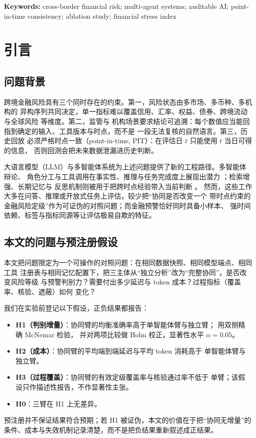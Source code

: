\documentclass[UTF8,fontset=fandol,11pt,a4paper]{ctexart}
\begin{document}
\vspace{0.6em}
\noindent\textbf{Keywords:} cross-border financial risk; multi-agent systems; auditable AI;
point-in-time consistency; ablation study; financial stress index

\section{引言}

\subsection{问题背景}

跨境金融风险具有三个同时存在的约束。第一，风险状态由多市场、多币种、多机构的
异构序列共同决定，单一指标难以覆盖信用、汇率、权益、债券、跨境流动与全球风险
等维度\citep{illing2006measuring,hollo2012ciss,cardarelli2011financial}。第二，监管与
机构场景要求结论可追溯：每个数值应当能回指到确定的输入、工具版本与时点，而不是
一段无法复核的自然语言\citep{schneier1999audit,parno2013pinocchio}。第三，历史回放
必须严格时点一致（point-in-time, PIT）：在评估日 $t$ 只能使用 $t$ 当日可得的信息，
否则回测会把未来数据泄漏进历史判断\citep{kaufman2012leakage,bailey2016overfitting}。

大语言模型（LLM）与多智能体系统为上述问题提供了新的工程路径。多智能体辩论、
角色分工与工具调用在事实性、推理与任务完成度上展现出潜力
\citep{du2023debate,liang2023mad,wu2023autogen,hong2023metagpt}；检索增强、长期记忆与
反思机制则被用于把跨时点经验带入当前判断
\citep{lewis2020rag,park2023generative,shinn2023reflexion,packer2023memgpt}。
然而，这些工作大多在问答、推理或开放式任务上评估，较少把“协同是否改变一个
带时点约束的金融风险定级”作为可证伪的对照问题；而金融预警恰好同时具备小样本、
强时间依赖、标签与指标同源等让评估极易自欺的特征。

\subsection{本文的问题与预注册假设}

本文把问题限定为一个可操作的对照问题：在相同数据快照、相同模型端点、相同工具
注册表与相同记忆配置下，把三主体从“独立分析”改为“完整协同”，是否改变风险等级
与预警判别力？需要付出多少延迟与 token 成本？过程指标（覆盖率、核验、遮蔽）如何
变化？

我们在实验前登记以下假设，正负结果都报告：
\begin{itemize}
  \item \textbf{H1（判别增量）}：协同臂的均衡准确率高于单智能体臂与独立臂；
        用双侧精确 McNemar 检验，
        并对两项比较做 Holm 校正，显著性水平 $\alpha=0.05$。
  \item \textbf{H2（成本）}：协同臂的平均端到端延迟与平均 token 消耗高于
        单智能体臂与独立臂。
  \item \textbf{H3（过程覆盖）}：协同臂的有效定级覆盖率与核验通过率不低于
        单臂；该假设只作描述性报告，不作显著性主张。
  \item \textbf{H0}：三臂在 H1 上无差异。
\end{itemize}
预注册并不保证结果符合预期；若 H1 被证伪，本文的价值在于把“协同无增量”的
条件、成本与失效机制记录清楚，而不是把负结果重新叙述成正结果。
\end{document}
